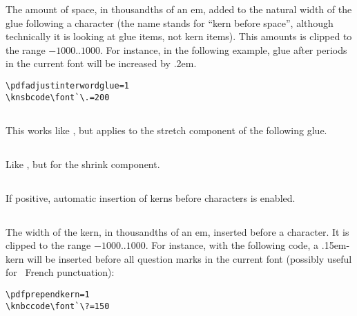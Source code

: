 \documentclass{pdftexmanual}
\begin{document}
The amount of space, in thousandths of an em, added to the natural width
of the glue following a character (the name stands for ``kern before
space'', although technically it is looking at glue items, not kern
items). This amounts is clipped to the range $-1000..1000$. For
instance, in the following example, glue after periods in the current
font will be increased by .2em.

\begin{verbatim}
\pdfadjustinterwordglue=1
\knsbcode\font`\.=200
\end{verbatim}

\subsection{}

This works like , but applies to the stretch component of
the following glue.

\subsection{}

Like , but for the shrink component.

\subsection{}

If positive, automatic insertion of kerns before characters is enabled.

\subsection{}

The width of the kern, in thousandths of an em, inserted before a
character. It is clipped to the range $-1000..1000$. For instance, with
the following code, a .15em-kern will be inserted before all question
marks in the current font (possibly useful for \eg\ French punctuation):

\begin{verbatim}
\pdfprependkern=1
\knbccode\font`\?=150
\end{verbatim}
\end{document}
